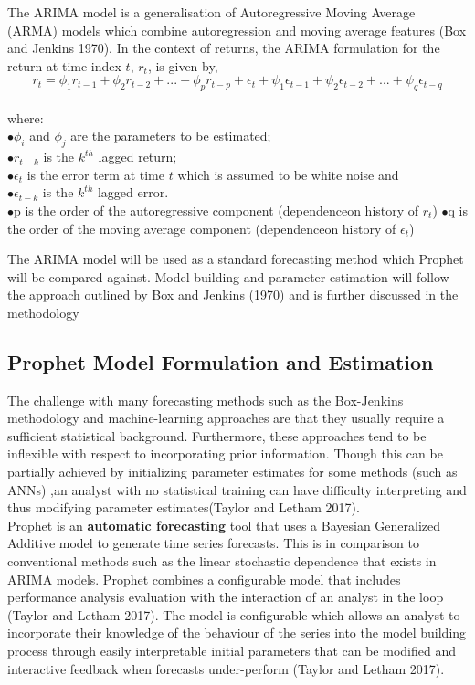 \documentclass[12pt,a4paper]{article}
\numberwithin{equation}{section}
\numberwithin{figure}{section}
\numberwithin{table}{section}
\begin{document}
The ARIMA model is a generalisation of Autoregressive Moving Average
(ARMA) models which combine autoregression and moving average features
(Box and Jenkins 1970). In the context of returns, the ARIMA formulation
for the return at time index \(t\), \(r_t\), is given by,
\[  r_t = \phi_1 r_{t-1} + \phi_2 r_{t-2} + ...+ \phi_p r_{t-p} + \epsilon_t +
        \psi_1 \epsilon_{t-1} + \psi_2 \epsilon_{t-2} + ... +\psi_q \epsilon_{t-q} \]\\
where:\\
\(\bullet \phi_i\) and \(\phi_j\) are the parameters to be estimated;\\
\(\bullet r_{t-k}\) is the \(k^{th}\) lagged return;\\
\(\bullet \epsilon_t\) is the error term at time \(t\) which is assumed
to be white noise and\\
\(\bullet\epsilon_{t-k}\) is the \(k^{th}\) lagged error.\\
\(\bullet\)p is the order of the autoregressive component (dependenceon
history of \(r_t\)) \(\bullet\)q is the order of the moving average
component (dependenceon history of \(\epsilon_t\))

The ARIMA model will be used as a standard forecasting method which
Prophet will be compared against. Model building and parameter
estimation will follow the approach outlined by Box and Jenkins (1970)
and is further discussed in the methodology

\subsection{Prophet Model Formulation and
Estimation}\label{prophet-model-formulation-and-estimation}

The challenge with many forecasting methods such as the Box-Jenkins
methodology and machine-learning approaches are that they usually
require a sufficient statistical background. Furthermore, these
approaches tend to be inflexible with respect to incorporating prior
information. Though this can be partially achieved by initializing
parameter estimates for some methods (such as ANNs) ,an analyst with no
statistical training can have difficulty interpreting and thus modifying
parameter estimates(Taylor and Letham 2017).\\
Prophet is an \textbf{automatic forecasting} tool that uses a Bayesian
Generalized Additive model to generate time series forecasts. This is in
comparison to conventional methods such as the linear stochastic
dependence that exists in ARIMA models. Prophet combines a configurable
model that includes performance analysis evaluation with the interaction
of an analyst in the loop (Taylor and Letham 2017). The model is
configurable which allows an analyst to incorporate their knowledge of
the behaviour of the series into the model building process through
easily interpretable initial parameters that can be modified and
interactive feedback when forecasts under-perform (Taylor and Letham
2017).
\end{document}
